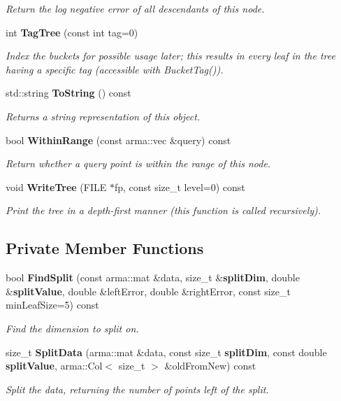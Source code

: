 \begin{DoxyCompactItemize}
\begin{DoxyCompactList}\small\item\em Return the log negative error of all descendants of this node. \end{DoxyCompactList}\item 
int {\bf Tag\-Tree} (const int tag=0)
\begin{DoxyCompactList}\small\item\em Index the buckets for possible usage later; this results in every leaf in the tree having a specific tag (accessible with Bucket\-Tag()). \end{DoxyCompactList}\item 
std\-::string {\bf To\-String} () const 
\begin{DoxyCompactList}\small\item\em Returns a string representation of this object. \end{DoxyCompactList}\item 
bool {\bf Within\-Range} (const arma\-::vec \&query) const 
\begin{DoxyCompactList}\small\item\em Return whether a query point is within the range of this node. \end{DoxyCompactList}\item 
void {\bf Write\-Tree} (F\-I\-L\-E $\ast$fp, const size\-\_\-t level=0) const 
\begin{DoxyCompactList}\small\item\em Print the tree in a depth-\/first manner (this function is called recursively). \end{DoxyCompactList}\end{DoxyCompactItemize}
\subsection*{Private Member Functions}
\begin{DoxyCompactItemize}
\item 
bool {\bf Find\-Split} (const arma\-::mat \&data, size\-\_\-t \&{\bf split\-Dim}, double \&{\bf split\-Value}, double \&left\-Error, double \&right\-Error, const size\-\_\-t min\-Leaf\-Size=5) const 
\begin{DoxyCompactList}\small\item\em Find the dimension to split on. \end{DoxyCompactList}\item 
size\-\_\-t {\bf Split\-Data} (arma\-::mat \&data, const size\-\_\-t {\bf split\-Dim}, const double {\bf split\-Value}, arma\-::\-Col$<$ size\-\_\-t $>$ \&old\-From\-New) const 
\begin{DoxyCompactList}\small\item\em Split the data, returning the number of points left of the split. \end{DoxyCompactList}\end{DoxyCompactItemize}

